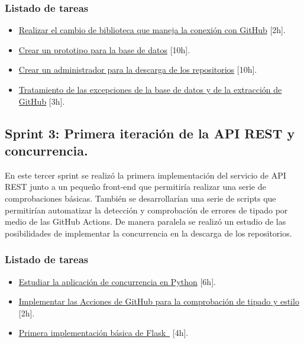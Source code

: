 \subsubsection{Listado de tareas}

\begin{itemize} \setlength\itemsep{0.2em}
    \item \href{https://github.com/MrpYA45/github-text-mining-tfg/issues/6}{Realizar el cambio de biblioteca que maneja la conexión con GitHub} [2h].
    \item \href{https://github.com/MrpYA45/github-text-mining-tfg/issues/8}{Crear un prototipo para la base de datos} [10h].
    \item \href{https://github.com/MrpYA45/github-text-mining-tfg/issues/7}{Crear un administrador para la descarga de los repositorios} [10h].
    \item \href{https://github.com/MrpYA45/github-text-mining-tfg/issues/9}{Tratamiento de las excepciones de la base de datos y de la extracción de GitHub} [3h].
\end{itemize}

\subsection{Sprint 3: Primera iteración de la API REST y concurrencia.}

En este tercer sprint se realizó la primera implementación del servicio de API REST junto a un pequeño front-end que permitiría realizar una serie de comprobaciones básicas. También se desarrollarían una serie de scripts que permitirían automatizar la detección y comprobación de errores de tipado por medio de las GitHub Actions. De manera paralela se realizó un estudio de las posibilidades de implementar la concurrencia en la descarga de los repositorios.

\subsubsection{Listado de tareas}

\begin{itemize} \setlength\itemsep{0.2em}
    \item \href{https://github.com/MrpYA45/github-text-mining-tfg/issues/11}{Estudiar la aplicación de concurrencia en Python} [6h].
    \item \href{https://github.com/MrpYA45/github-text-mining-tfg/issues/13}{Implementar las Acciones de GitHub para la comprobación de tipado y estilo} [2h].
    \item \href{https://github.com/MrpYA45/github-text-mining-tfg/issues/14}{Primera implementación básica de Flask } [4h].

\end{itemize}

